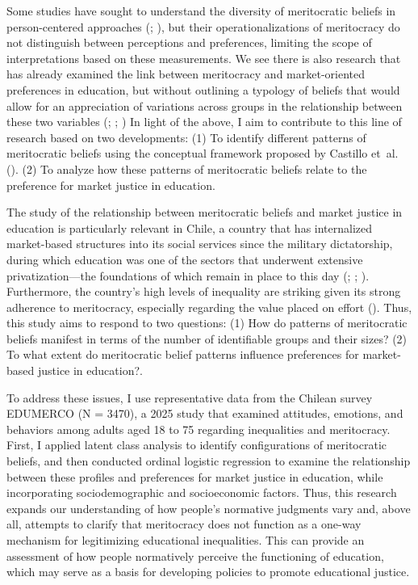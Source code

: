 \documentclass[
  spanish,
  a4paper,
  oneside]{scrbook}
\begin{document}
Some studies have sought to understand the diversity of meritocratic
beliefs in person-centered approaches
(;
), but their
operationalizations of meritocracy do not distinguish between
perceptions and preferences, limiting the scope of interpretations based
on these measurements. We see there is also research that has already
examined the link between meritocracy and market-oriented preferences in
education, but without outlining a typology of beliefs that would allow
for an appreciation of variations across groups in the relationship
between these two variables
(;
;
) In light of the above, I
aim to contribute to this line of research based on two developments:
(1) To identify different patterns of meritocratic beliefs using the
conceptual framework proposed by Castillo et~al.
(). (2) To analyze
how these patterns of meritocratic beliefs relate to the preference for
market justice in education.

The study of the relationship between meritocratic beliefs and market
justice in education is particularly relevant in Chile, a country that
has internalized market-based structures into its social services since
the military dictatorship, during which education was one of the sectors
that underwent extensive privatization---the foundations of which remain
in place to this day (;
;
).
Furthermore, the country's high levels of inequality are striking given
its strong adherence to meritocracy, especially regarding the value
placed on effort (). Thus, this study aims to respond to two questions: (1)
How do patterns of meritocratic beliefs manifest in terms of the number
of identifiable groups and their sizes? (2) To what extent do
meritocratic belief patterns influence preferences for market-based
justice in education?.

To address these issues, I use representative data from the Chilean
survey EDUMERCO (N = 3470), a 2025 study that examined attitudes,
emotions, and behaviors among adults aged 18 to 75 regarding
inequalities and meritocracy. First, I applied latent class analysis to
identify configurations of meritocratic beliefs, and then conducted
ordinal logistic regression to examine the relationship between these
profiles and preferences for market justice in education, while
incorporating sociodemographic and socioeconomic factors. Thus, this
research expands our understanding of how people's normative judgments
vary and, above all, attempts to clarify that meritocracy does not
function as a one-way mechanism for legitimizing educational
inequalities. This can provide an assessment of how people normatively
perceive the functioning of education, which may serve as a basis for
developing policies to promote educational justice.
\end{document}
